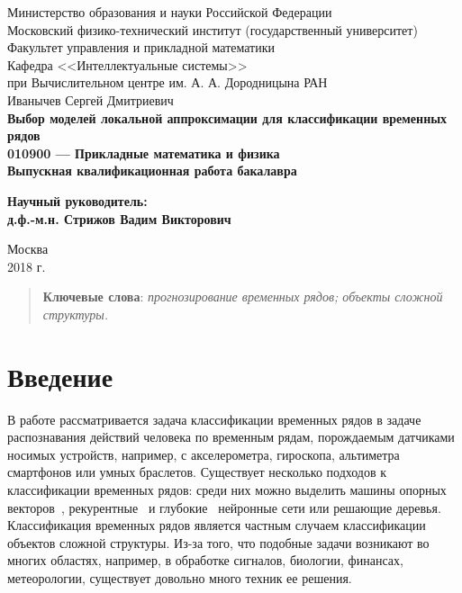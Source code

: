 \documentclass[12pt, fleqn, unicode]{article}
\begin{document}
{
\renewcommand{\baselinestretch}{1}
\thispagestyle{empty}
\begin{center}
    \sc
        Министерство образования и науки Российской Федерации\\
        Московский физико-технический институт
        {\rm(государственный университет)}\\
        Факультет управления и прикладной математики\\
        Кафедра <<Интеллектуальные системы>>\\
        при Вычислительном центре им. А. А. Дородницына РАН\\[35mm]
    \rm\large
        Иванычев Сергей Дмитриевич\\[10mm]
    \bf\Large
    Выбор моделей локальной аппроксимации для классификации временных рядов\\[10mm]
    \rm\normalsize
        010900 — Прикладные математика и физика\\[10mm]
    \sc
        Выпускная квалификационная работа бакалавра\\[30mm]
\end{center}
\hfill\parbox{80mm}{
    \begin{flushleft}
    \bf
        Научный руководитель:\\
    \rm
        д.ф.-м.н. Стрижов Вадим Викторович\\[4.9cm]
    \end{flushleft}
}
\begin{center}
    Москва\\
    2018 г.
\end{center}
}

\newpage
\tableofcontents

\newpage
\begin{abstract}


  \bigskip
    \textbf{Ключевые слова}: \emph{прогнозирование временных рядов; объекты сложной структуры.}
\end{abstract}

\newpage
\section{Введение}


В работе рассматривается задача классификации временных рядов в задаче
распознавания действий человека по временным рядам,
порождаемым датчиками носимых устройств, например, с акселерометра, гироскопа,
альтиметра смартфонов или умных браслетов. Существует несколько подходов к
классификации временных рядов: среди них можно выделить машины опорных
векторов~\cite{Kampouraki2009, Eads2002},
рекурентные~\cite{Husken2003} и глубокие~\cite{Zheng2014} нейронные сети или
решающие деревья.
Классификация временных рядов является частным случаем классификации
объектов сложной структуры. Из-за того, что подобные задачи возникают во
многих областях, например, в обработке сигналов, биологии, финансах,
метеорологии, существует довольно много техник ее решения.
\end{document}
